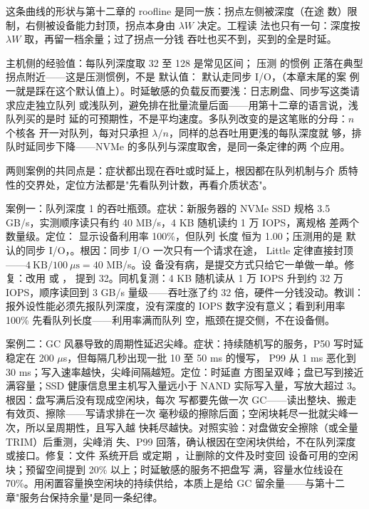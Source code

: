这条曲线的形状与第十二章的 roofline 是同一族：拐点左侧被深度（在途
数）限制，右侧被设备能力封顶，拐点本身由 $\lambda W$ 决定。工程读
法也只有一句：深度按 $\lambda W$ 取，再留一档余量；过了拐点一分钱
吞吐也买不到，买到的全是时延。

主机侧的经验值：每队列深度取 32 至 128 是常见区间； 压测
的惯例  正落在典型拐点附近——这是压测惯例，不是
默认值： 默认走同步 I/O，（本章末尾的案
例一就是踩在这个默认值上）。时延敏感的负载反而要浅：日志刷盘、同步写这类请求应走独立队列
或浅队列，避免排在批量流量后面——用第十二章的语言说，浅队列买的是时
延的可预期性，不是平均速度。多队列改变的是这笔账的分母：$n$ 个核各
开一对队列，每对只承担 $\lambda/n$，同样的总吞吐用更浅的每队深度就
够，排队时延同步下降——NVMe 的多队列与深度取舍，是同一条定律的两
个应用。

两则案例的共同点是：症状都出现在吞吐或时延上，根因都在队列机制与介
质特性的交界处，定位方法都是"先看队列计数，再看介质状态"。

案例一：队列深度 1 的吞吐瓶颈。症状：新服务器的 NVMe SSD 规格
3.5 GB/s，实测顺序读只有约 40 MB/s，4 KB 随机读约 1 万 IOPS，离规格
差两个数量级。定位： 显示设备利用率 100\%，但队列
长度  恒为 1.00；压测用的是  默认的同步
I/O，。根因：同步 I/O 一次只有一个请求在途，
Little 定律直接封顶——$4\ \text{KB}/100\ \mu\text{s}=40$ MB/s。设
备没有病，是提交方式只给它一单做一单。修复：改用  或
， 提到 32。同机复测：4 KB 随机读从 1
万 IOPS 升到约 32 万 IOPS，顺序读回到 3 GB/s 量级——吞吐涨了约 32
倍，硬件一分钱没动。教训：报外设性能必须先报队列深度，没有深度的
IOPS 数字没有意义；看到利用率 100\% 先看队列长度——利用率满而队列
空，瓶颈在提交侧，不在设备侧。

案例二：GC 风暴导致的周期性延迟尖峰。症状：持续随机写的服务，P50
写时延稳定在 200 $\mu$s，但每隔几秒出现一批 10 至 50 ms 的慢写，
P99 从 1 ms 恶化到 30 ms；写入速率越快，尖峰间隔越短。定位：时延直
方图呈双峰；盘已写到接近满容量；SSD 健康信息里主机写入量远小于
NAND 实际写入量，写放大超过 3。根因：盘写满后没有现成空闲块，每次
写都要先做一次 GC——读出整块、搬走有效页、擦除——写请求排在一次
毫秒级的擦除后面；空闲块耗尽一批就尖峰一次，所以呈周期性，且写入越
快耗尽越快。对照实验：对盘做安全擦除（或全量 TRIM）后重测，尖峰消
失、P99 回落，确认根因在空闲块供给，不在队列深度或接口。修复：文件
系统开启  或定期 ，让删除的文件及时变回
设备可用的空闲块；预留空间提到 20\% 以上；时延敏感的服务不把盘写
满，容量水位线设在 70\%。用闲置容量换空闲块的持续供给，本质上是给
GC 留余量——与第十二章"服务台保持余量"是同一条纪律。


